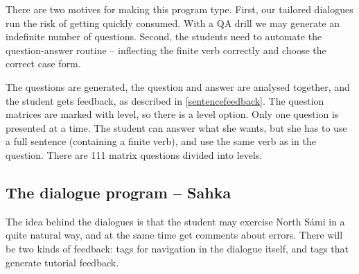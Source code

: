 \documentclass[11pt]{article}
\begin{document}
There are two motives for making this program type. First, our tailored dialogues 
run the risk of getting quickly consumed. With a QA drill we may generate an indefinite number of questions. Second, the students need to automate the question-answer routine -- inflecting the finite verb correctly and choose the correct case form.

The questions are generated, the question and answer are analysed together, and the student gets feedback, as described in \ref{sentencefeedback}. The question matrices are marked with level, so there is a level option. Only one question is presented at a time. The student can answer what she wants, but she has to use a full sentence (containing a finite verb), and use the same verb as in the question. There are 111 matrix questions divided into levels.



\subsection{The dialogue program -- Sahka}
The idea behind the dialogues is that the student may exercise North Sámi in a quite natural way, and at the same time get comments about errors. There will be two kinds of feedback: tags for navigation in the dialogue itself, and tags that generate tutorial feedback.
\end{document}
